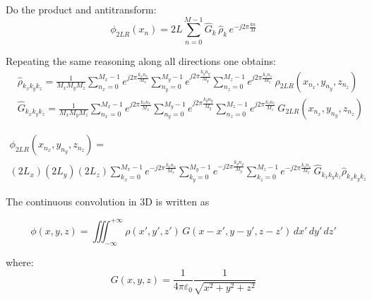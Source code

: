 \documentclass[a4paper,12pt]{report}
\begin{document}
Do the product and antitransform:
\begin{equation}
\phi_{2LR}(x_n) = 
2L \sum_{n=0}^{M-1}  
\hat{G}_k \, \hat{\rho}_k\, e^{-j2\pi \frac{kn}{M}}
\end{equation}

Repeating the same reasoning along all directions one obtains:
\begin{align}
&\hat{\rho}_{k_x k_y k_z} = 
\frac{1}{M_x M_y M_z}
\sum_{n_x=0}^{M_x-1} e^{j 2\pi  \frac{k_x n_x}{M_x}} 
\sum_{n_y=0}^{M_y-1} e^{j 2\pi  \frac{k_y n_y}{M_y}}
\sum_{n_z=0}^{M_z-1} e^{j 2\pi  \frac{k_z n_z}{M_z}}\, 
\rho_{2LR}(x_{n_x}, y_{n_y}, z_{n_z})\\
&\hat{G}_{k_x k_y k_z} = 
\frac{1}{M_x M_y M_z}
\sum_{n_x=0}^{M_x-1} e^{j 2\pi  \frac{k_x n_x}{M_x}} 
\sum_{n_y=0}^{M_y-1} e^{j 2\pi  \frac{k_y n_y}{M_y}}
\sum_{n_z=0}^{M_z-1} e^{j 2\pi  \frac{k_z n_z}{M_z}}\, 
G_{2LR}(x_{n_x}, y_{n_y}, z_{n_z})
\end{align}

\begin{multline}
\phi_{2LR}(x_{n_x}, y_{n_y}, z_{n_z}) = \\
(2L_x)(2L_y)(2L_z)
\sum_{k_x=0}^{M_x-1} e^{-j 2\pi  \frac{k_x n_x}{M_x}} 
\sum_{k_y=0}^{M_y-1} e^{-j 2\pi  \frac{k_y n_y}{M_y}}
\sum_{k_z=0}^{M_z-1} e^{-j 2\pi  \frac{k_z n_z}{M_z}}\, 
\hat{G}_{k_x k_y k_z} \hat{\rho}_{k_x k_y k_z}
\end{multline}

The continuous convolution in 3D is written as 

\begin{equation}
\phi(x, y, z) = \iiint_{-\infty}^{+\infty} \rho(x', y', z')
   \,G(x-x', y-y', z-z')\,dx'\,dy'\,dz'
\end{equation}

where:
\begin{equation}
G(x, y, z) = \frac{1}{4\pi\varepsilon_0}\frac{1}{
\sqrt{x^2 +y^2 +z^2}
}
\end{equation}
\end{document}
